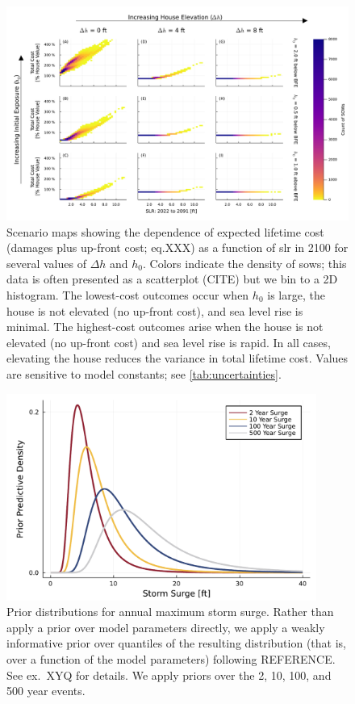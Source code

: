 \documentclass[12pt]{article}
\begin{document}
\begin{figure}
    \centering
    \includegraphics[width=\textwidth]{scenario-map-slr-cost}
    \caption{
        Scenario maps showing the dependence of expected lifetime cost (damages plus up-front cost; eq.XXX) as a function of \gls{slr} in 2100 for several values of $\Delta h$ and $h_0$.
        Colors indicate the density of \glspl{sow}; this data is often presented as a scatterplot (CITE) but we bin to a 2D histogram. %
        The lowest-cost outcomes occur when $h_0$ is large, the house is not elevated (no up-front cost), and sea level rise is minimal.
        The highest-cost outcomes arise when the house is not elevated (no up-front cost) and sea level rise is rapid.
        In all cases, elevating the house reduces the variance in total lifetime cost.
        Values are sensitive to model constants; see \cref{tab:uncertainties}.
    }\label{fig:scenario-map-slr-cost}
\end{figure}

\begin{figure}
    \centering
    \includegraphics[width=4in]{surge-gev-priors}
    \caption{
        Prior distributions for annual maximum storm surge.
        Rather than apply a prior over model parameters directly, we apply a weakly informative prior over quantiles of the resulting distribution (that is, over a function of the model parameters) following REFERENCE. %
        See ex.~XYQ for details. %
        We apply priors over the 2, 10, 100, and 500 year events.
    }\label{fig:surge-gev-priors}
\end{figure}
\end{document}
